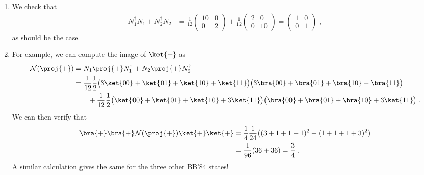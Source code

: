\begin{exercises}
\begin{enumerate}
\item We check that 
\begin{align*}
N_1^\dagger N_1 + N_2^\dagger N_2  &= \frac{1}{12}\begin{pmatrix} 10 & 0 \\ 0 & 2 \end{pmatrix}+\frac{1}{12} \begin{pmatrix} 2 & 0 \\ 0 & 10 \end{pmatrix} = \begin{pmatrix} 1 & 0 \\ 0 & 1\end{pmatrix}\;,
\end{align*}
as should be the case. 
\item For example, we can compute the image of $\ket{+}$ as 
\begin{align*} 
\mathcal{N}(\proj{+}) &= N_1 \proj{+} N_1^\dagger + N_2 \proj{+}N_2^\dagger \\
&= \frac{1}{12} \frac{1}{2}\big( 3\ket{00} + \ket{01} + \ket{10} + \ket{11} \big)\big( 3\bra{00} + \bra{01} + \bra{10} + \bra{11} \big)\\
&\qquad +\frac{1}{12} \frac{1}{2}\big( \ket{00} + \ket{01} + \ket{10} + 3\ket{11} \big)\big( \bra{00} + \bra{01} + \bra{10} + 3\ket{11} \big)\;.
\end{align*}
We can then verify that 
\begin{align*}
\bra{+}\bra{+}\mathcal{N}(\proj{+})\ket{+}\ket{+} &= \frac{1}{4}\frac{1}{24}\big( (3+1+1+1)^2 + (1+1+1+3)^2 \big)\\
&= \frac{1}{96}( 36+36) = \frac{3}{4}\;.
\end{align*}
A similar calculation gives the same for the three other BB'84 states!
\end{enumerate}
\end{exercises}